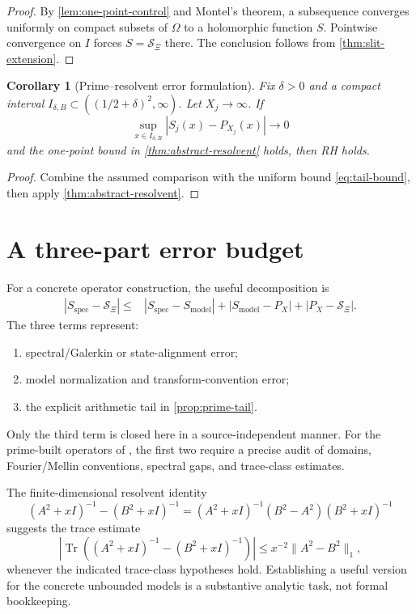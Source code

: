 \documentclass[11pt]{article}
\newtheorem{corollary}[theorem]{Corollary}
\theoremstyle{definition}
\newcommand{\XiR}{\mathcal S_{\Xi}}
\newcommand{\Tr}{\operatorname{Tr}}
\begin{document}
\begin{proof}
By \cref{lem:one-point-control} and Montel's theorem, a subsequence converges uniformly on
compact subsets of $\Omega$ to a holomorphic function $S$. Pointwise convergence on $I$
forces $S=\XiR$ there. The conclusion follows from \cref{thm:slit-extension}.
\end{proof}

\begin{corollary}[Prime--resolvent error formulation]\label{cor:prime-resolvent-error}
Fix $\delta>0$ and a compact interval
$I_{\delta,B}\subset((1/2+\delta)^2,\infty)$. Let $X_j\to\infty$. If
\[
 \sup_{x\in I_{\delta,B}}|S_j(x)-P_{X_j}(x)|\to0
\]
and the one-point bound in \cref{thm:abstract-resolvent} holds, then RH holds.
\end{corollary}

\begin{proof}
Combine the assumed comparison with the uniform bound \eqref{eq:tail-bound}, then apply
\cref{thm:abstract-resolvent}.
\end{proof}

\section{A three-part error budget}

For a concrete operator construction, the useful decomposition is
\begin{align*}
 |S_{\mathrm{spec}}-\XiR|
 \le{}&|S_{\mathrm{spec}}-S_{\mathrm{model}}|
 +|S_{\mathrm{model}}-P_X|
 +|P_X-\XiR|.
\end{align*}
The three terms represent:
\begin{enumerate}[label=(\arabic*)]
  \item spectral/Galerkin or state-alignment error;
  \item model normalization and transform-convention error;
  \item the explicit arithmetic tail in \cref{prop:prime-tail}.
\end{enumerate}
Only the third term is closed here in a source-independent manner. For the prime-built
operators of \cite{ConnesConsaniMoscovici2025}, the first two require a precise audit of
domains, Fourier/Mellin conventions, spectral gaps, and trace-class estimates.

The finite-dimensional resolvent identity
\[
 (A^2+xI)^{-1}-(B^2+xI)^{-1}
 =(A^2+xI)^{-1}(B^2-A^2)(B^2+xI)^{-1}
\]
suggests the trace estimate
\[
 \left|\Tr\left((A^2+xI)^{-1}-(B^2+xI)^{-1}\right)\right|
 \le x^{-2}\|A^2-B^2\|_1,
\]
whenever the indicated trace-class hypotheses hold. Establishing a useful version for the
concrete unbounded models is a substantive analytic task, not formal bookkeeping.
\end{document}
